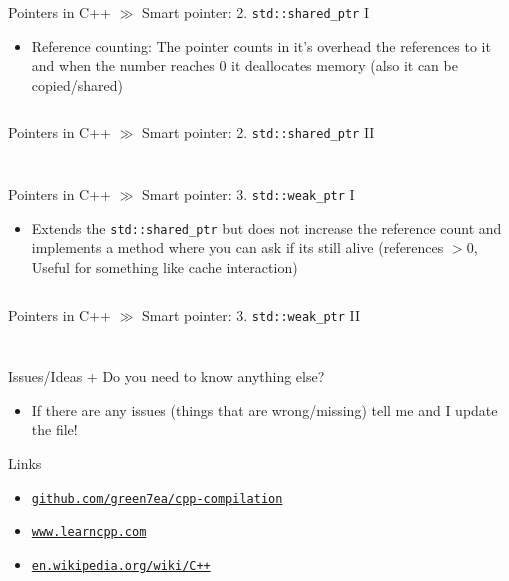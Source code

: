 \documentclass[10pt]{beamer}
\newcommand{\urlCustom}[1]{\href{https://#1}{\textcolor{greyCustom}{\texttt{#1}}}}
\begin{document}
\begin{frame}{Pointers in C++ $\gg$ Smart pointer: 2.  \texttt{std::shared_ptr} I}
\begin{itemize}
	\item Reference counting: The pointer counts in it's overhead the references to it and when the number reaches $0$ it deallocates memory (also it can be copied/shared)
	\inputminted[bgcolor=lightGreyCustom,fontsize=\scriptsize,lastline=17]{cpp}{./resources/shared_ptr.cpp}
\end{itemize}
\end{frame}

\begin{frame}{Pointers in C++ $\gg$ Smart pointer: 2.  \texttt{std::shared_ptr} II}
\begin{itemize}
	\inputminted[bgcolor=lightGreyCustom,fontsize=\scriptsize,firstline=18]{cpp}{./resources/shared_ptr.cpp}
	\vspace{-9mm}
	\inputminted[bgcolor=lightGreyCustom,fontsize=\scriptsize ]{sh}{./resources/build_shared_ptr.sh}
\end{itemize}
\end{frame}

\begin{frame}{Pointers in C++ $\gg$ Smart pointer: 3.  \texttt{std::weak_ptr} I}
\begin{itemize}
	\item Extends the \texttt{std::shared_ptr} but does not increase the reference count and implements a method where you can ask if its still alive (references $> 0$, Useful for something like cache interaction)
	\inputminted[bgcolor=lightGreyCustom,fontsize=\scriptsize,lastline=17]{cpp}{./resources/weak_ptr.cpp}
\end{itemize}
\end{frame}

\begin{frame}{Pointers in C++ $\gg$ Smart pointer: 3.  \texttt{std::weak_ptr} II}
\begin{itemize}
	\inputminted[bgcolor=lightGreyCustom,fontsize=\scriptsize,firstline=18]{cpp}{./resources/weak_ptr.cpp}
	\vspace{-9mm}
	\inputminted[bgcolor=lightGreyCustom,fontsize=\scriptsize ]{sh}{./resources/build_weak_ptr.sh}
\end{itemize}
\end{frame}


\begin{frame}{Issues/Ideas + Do you need to know anything else?}
	\begin{itemize}
		\item If there are any issues (things that are wrong/missing) tell me and I update the file!
	\end{itemize}
\end{frame}

\begin{frame}{Links}
	\begin{itemize}
		\item\urlCustom{github.com/green7ea/cpp-compilation}
		\item\urlCustom{www.learncpp.com}
		\item\urlCustom{en.wikipedia.org/wiki/C++}
		
	\end{itemize}
	\begin{center}\doclicenseThis\end{center}
\end{frame}
\end{document}

